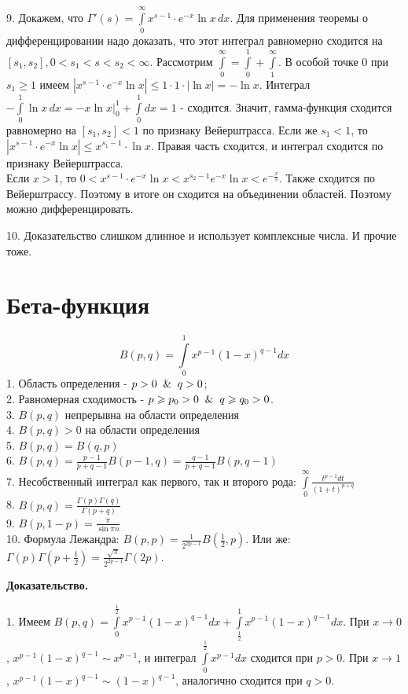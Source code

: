 9. Докажем, что 
$\Gamma'(s)=\int\limits_{0}^{\infty}x^{s-1}\cdot e^{-x}\ln x\,dx$. Для 
применения теоремы о дифференцировании надо доказать,
что этот интеграл равномерно сходится на $[s_1,s_2],0<s_1<s<s_2<\infty$. 
Рассмотрим
$\int\limits_{0}^{\infty} = \int\limits_{0}^{1} + \int\limits_{1}^{\infty}$.
В особой точке 0 при $s_1\geqslant1$ имеем
$|x^{s-1}\cdot e^{-x}\ln x|\leqslant 1\cdot 1\cdot |\ln x|=-\ln x$. 
Интеграл $-\int\limits_{0}^{1}\ln x\,dx=-x\ln x\big|^1_0+
\int\limits_{0}^{1}dx=1$ - сходится. Значит, гамма-функция сходится равномерно
на $[s_1,s_2]<1$ по признаку Вейерштрасса. Если же $s_1<1$, то
$|x^{s-1}\cdot e^{-x}\ln x|\leqslant x^{s_1-1}\cdot\ln x$. 
Правая часть сходится, и интеграл сходится по признаку Вейерштрасса.\\
Если $x>1$, то  $0<x^{s-1}\cdot e^{-x}\ln x<x^{s_2-1}e^{-x}\ln x
<e^{-\frac{x}{3}}$. Также сходится по Вейерштрассу. Поэтому в итоге он сходится
на объединении областей. Поэтому можно дифференцировать.

10. Доказательство слишком длинное и использует комплексные числа. И прочие 
тоже. 

\section{Бета-функция}
$$B(p,q)=\int\limits_{0}^{1} x^{p-1}(1-x)^{q-1}dx$$ 
1. Область определения - $p>0\And q>0$;\\
2. Равномерная сходимость -  $p\geqslant p_0>0\And q\geqslant q_0>0$.\\
3. $B(p,q)$ непрерывна на области определения\\
4. $B(p,q)>0$  на области определения\\
5. $B(p,q)=B(q,p)$\\ 
6. $B(p,q)=\frac{p-1}{p+q-1}B(p-1,q)=\frac{q-1}{p+q-1}B(p,q-1)$ \\
7. Несобственный интеграл как первого, так и второго рода:
$\int\limits_{0}^{\infty} \frac{t^{p-1}dt}{(1+t)^{p+q}}$\\
8. $\boxed{B(p,q)=\frac{\Gamma(p)\Gamma(q)}{\Gamma(p+q)}}$ \\
9. $B(p,1-p)=\frac{\pi}{\sin\pi n}$ \\
10. Формула Лежандра: $\boxed{B(p,p)=
\frac{1}{2^{2p-1}}B\left(\frac{1}{2},p\right)}$.
Или же: $\Gamma(p)\Gamma(p+\frac{1}{2})=\frac{\sqrt{\pi}}{2^{2p-1}}\Gamma(2p)$.

\textbf{Доказательство.}

1. Имеем  $B(p,q)=\int\limits_{0}^{\frac{1}{2}}x^{p-1}(1-x)^{q-1}dx+
\int\limits_{\frac{1}{2}}^{1}x^{p-1}(1-x)^{q-1}dx$. При $x\to 0$,
$x^{p-1}(1-x)^{q-1}\sim x^{p-1}$, и интеграл  $\int\limits_{0}^{\frac{1}{2}}
x^{p-1}dx$ сходится при $p>0$. При  $x\to 1$, 
$x^{p-1}(1-x)^{q-1}\sim(1-x)^{q-1}$, аналогично сходится при  $q>0$. 


